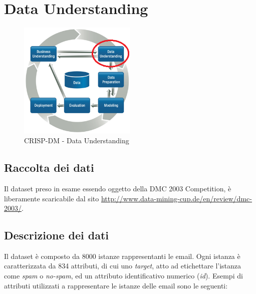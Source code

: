 \chapter{Data Understanding}

\begin{figure}[hbtp]
	\centering
	\includegraphics[width=0.5\textwidth]{./images/CRISPDM_2.png}
	\caption{CRISP-DM - Data Understanding}
	\label{CRISPDM_2}
\end{figure}

\section{Raccolta dei dati}
Il dataset preso in esame essendo oggetto della DMC 2003 Competition, è liberamente scaricabile dal sito \url{http://www.data-mining-cup.de/en/review/dmc-2003/}. 

\section{Descrizione dei dati}
Il dataset è composto da 8000 istanze rappresentanti le email. Ogni istanza è caratterizzata da 834 attributi, di cui uno \textit{target}, atto ad etichettare l'istanza come \textit{spam} o \textit{no-spam}, ed un attributo identificativo numerico (\textit{id}). Esempi di attributi utilizzati a rappresentare le istanze delle email sono le seguenti:

